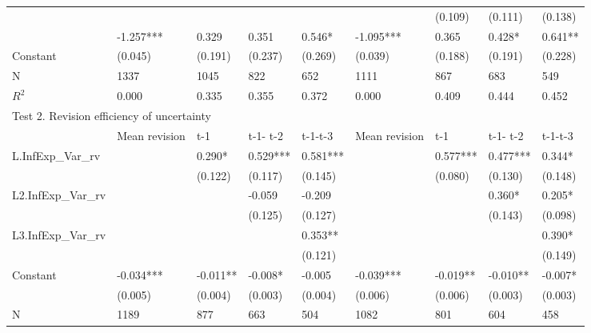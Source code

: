 \documentclass[]{article}
\begin{document}
\begin{table}
\begin{adjustbox}{width={24cm},totalheight={14cm}}
\begin{threeparttable}
\begin{tabular}{lllllllll}
						&               &           &          &          &               & (0.109)   & (0.111)   & (0.138)   \\
						& -1.257***     & 0.329     & 0.351    & 0.546*   & -1.095***     & 0.365     & 0.428*    & 0.641**   \\
						Constant & (0.045)       & (0.191)   & (0.237)  & (0.269)  & (0.039)       & (0.188)   & (0.191)   & (0.228)   \\
						\hline 
						N                   & 1337          & 1045      & 822      & 652      & 1111          & 867       & 683       & 549       \\
						$R^2$                  & 0.000         & 0.335     & 0.355    & 0.372    & 0.000         & 0.409     & 0.444     & 0.452     \\
						\hline 
						\multicolumn{9}{l}{Test 2. Revision efficiency of uncertainty}                                                            \\
						\hline 
						& Mean revision & t-1       & t-1- t-2 & t-1-t-3  & Mean revision & t-1       & t-1- t-2  & t-1-t-3   \\
						\hline 
						L.InfExp\_Var\_rv   &               & 0.290*    & 0.529*** & 0.581*** &               & 0.577***  & 0.477***  & 0.344*    \\
						&               & (0.122)   & (0.117)  & (0.145)  &               & (0.080)   & (0.130)   & (0.148)   \\
						L2.InfExp\_Var\_rv  &               &           & -0.059   & -0.209   &               &           & 0.360*    & 0.205*    \\
						&               &           & (0.125)  & (0.127)  &               &           & (0.143)   & (0.098)   \\
						L3.InfExp\_Var\_rv  &               &           &          & 0.353**  &               &           &           & 0.390*    \\
						&               &           &          & (0.121)  &               &           &           & (0.149)   \\
						Constant              & -0.034***     & -0.011**  & -0.008*  & -0.005   & -0.039***     & -0.019**  & -0.010**  & -0.007*   \\
						& (0.005)       & (0.004)   & (0.003)  & (0.004)  & (0.006)       & (0.006)   & (0.003)   & (0.003)   \\
						\hline 
						N                   & 1189          & 877       & 663      & 504      & 1082          & 801       & 604       & 458       \\

\end{tabular}
\end{threeparttable}
\end{adjustbox}
\end{table}
\end{document}
